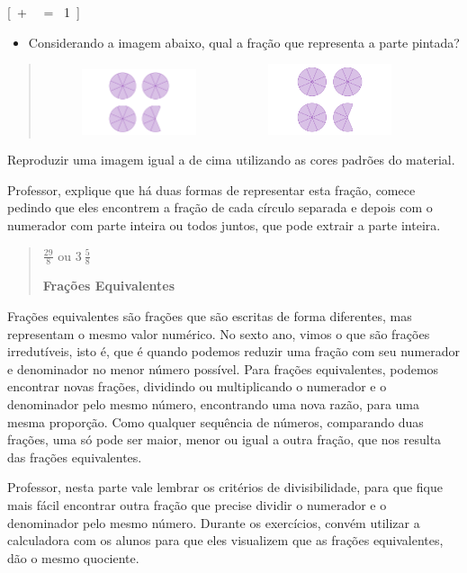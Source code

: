 [\  + \ \  = \ 1\ ]

\begin{itemize}
\tightlist
\item
  Considerando a imagem abaixo, qual a fração que representa a parte
  pintada?
\end{itemize}

\begin{quote}
\includegraphics[width=2.22515in,height=0.76042in]{./imgSAEB_7_MAT/media/image5.png}\includegraphics[width=2.18869in,height=0.81698in]{./imgSAEB_7_MAT/media/image5.png}
\end{quote}

Reproduzir uma imagem igual a de cima utilizando as cores padrões do
material.

Professor, explique que há duas formas de representar esta fração,
comece pedindo que eles encontrem a fração de cada círculo separada e
depois com o numerador com parte inteira ou todos juntos, que pode
extrair a parte inteira.

\begin{quote}
\(\frac{29}{8}\) ou \(3\ \frac{5}{8}\)

\textbf{Frações Equivalentes}
\end{quote}

Frações equivalentes são frações que são escritas de forma diferentes,
mas representam o mesmo valor numérico. No sexto ano, vimos o que são
frações irredutíveis, isto é, que é quando podemos reduzir uma fração
com seu numerador e denominador no menor número possível. Para frações
equivalentes, podemos encontrar novas frações, dividindo ou
multiplicando o numerador e o denominador pelo mesmo número, encontrando
uma nova razão, para uma mesma proporção. Como qualquer sequência de
números, comparando duas frações, uma só pode ser maior, menor ou igual
a outra fração, que nos resulta das frações equivalentes.

Professor, nesta parte vale lembrar os critérios de divisibilidade, para
que fique mais fácil encontrar outra fração que precise dividir o
numerador e o denominador pelo mesmo número. Durante os exercícios,
convém utilizar a calculadora com os alunos para que eles visualizem que
as frações equivalentes, dão o mesmo quociente.

